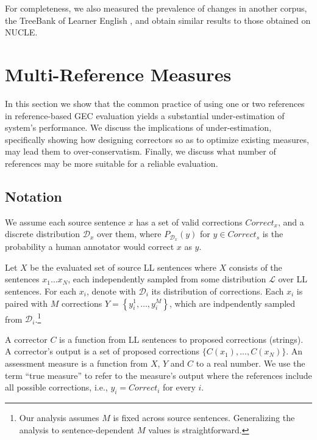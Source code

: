 \documentclass[letter,11pt]{article}
\begin{document}
For completeness, we also measured the prevalence of changes in
another corpus, the TreeBank of Learner English \cite{yannakoudakis2011new},
and obtain  similar results to those obtained on NUCLE.


\section{Multi-Reference Measures}\label{sec:increase-reference}

In this section we show that the common practice of using one or two references in reference-based
GEC evaluation yields a substantial under-estimation of system's performance.
We discuss the implications of under-estimation, specifically showing how designing
correctors so as to optimize existing measures, may lead them to over-conservatism.
Finally, we discuss what number of references may be more suitable for a reliable evaluation.


\subsection{Notation}

We assume each source sentence $x$ has a set of valid corrections $Correct_x$,
and a discrete distribution $\mathcal{D}_x$ over them, where $P_{\mathcal{D}_x}(y)$
for $y \in Correct_s$ is the probability a human annotator would correct $x$ as $y$.

Let $X$ be the evaluated set of source LL sentences where $X$ consists
of the sentences $x_{1}\ldots x_N$, each independently sampled from some
distribution $\mathcal{L}$ over LL sentences.
For each $x_i$, denote with $\mathcal{D}_{i}$ its distribution of corrections.
Each $x_i$ is paired with $M$ corrections $Y = \left\{y_{i}^{1},\ldots, y_{i}^{M}\right\}$,
which are indpendently sampled from $\mathcal{D}_{i}$.\footnote{Our analysis assumes $M$
  is fixed across source sentences. Generalizing the analysis to sentence-dependent $M$
  values is straightforward.} 


A corrector $C$ is a function from LL sentences to proposed corrections  (strings).
A corrector's output is a set of proposed corrections $\{C(x_1),...,C(x_N)\}$.
An assessment measure is a function from $X$, $Y$ and $C$ to
a real number. We use the term ``true measure'' to refer to the measure's
output where the references include all possible corrections, i.e., $y_i=Correct_i$ for
every $i$.
\end{document}
